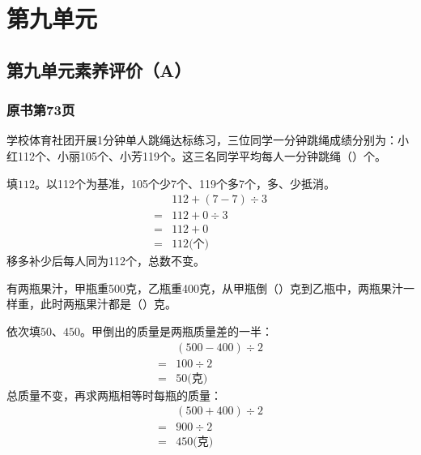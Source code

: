 \chapter{第九单元}


\section{第九单元素养评价（A）}



\subsection*{原书第73页}

学校体育社团开展1分钟单人跳绳达标练习，三位同学一分钟跳绳成绩分别为：小红112个、小丽105个、小芳119个。这三名同学平均每人一分钟跳绳（\hspace{1.8em}）个。\par
\begin{BookAnswer}
填\(112\)。以112个为基准，105个少7个、119个多7个，多、少抵消。\[\begin{aligned}&112+(7-7)\div3\\={}&112+0\div3\\={}&112+0\\={}&112\text{(个)}\end{aligned}\]移多补少后每人同为112个，总数不变。
\end{BookAnswer}

有两瓶果汁，甲瓶重500克，乙瓶重400克，从甲瓶倒（\hspace{1.8em}）克到乙瓶中，两瓶果汁一样重，此时两瓶果汁都是（\hspace{1.8em}）克。\par
\begin{BookAnswer}
依次填\(50\)、\(450\)。甲倒出的质量是两瓶质量差的一半：\[\begin{aligned}&(500-400)\div2\\={}&100\div2\\={}&50\text{(克)}\end{aligned}\]总质量不变，再求两瓶相等时每瓶的质量：\[\begin{aligned}&(500+400)\div2\\={}&900\div2\\={}&450\text{(克)}\end{aligned}\]
\end{BookAnswer}


